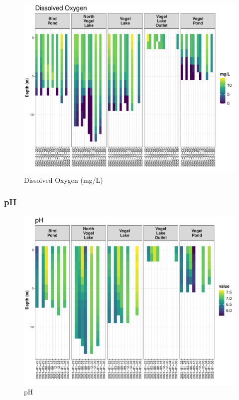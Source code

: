 \documentclass[
]{book}
\begin{document}
\begin{figure}
\centering
\includegraphics{Miller_Creek_Vogel_Lake_Water_Quality_files/figure-latex/unnamed-chunk-10-1.pdf}
\caption{\label{fig:unnamed-chunk-10}Dissolved Oxygen (mg/L)}
\end{figure}

\hypertarget{ph}{%
\subsubsection{pH}\label{ph}}

\begin{figure}
\centering
\includegraphics{Miller_Creek_Vogel_Lake_Water_Quality_files/figure-latex/unnamed-chunk-11-1.pdf}
\caption{\label{fig:unnamed-chunk-11}pH}
\end{figure}
\end{document}
